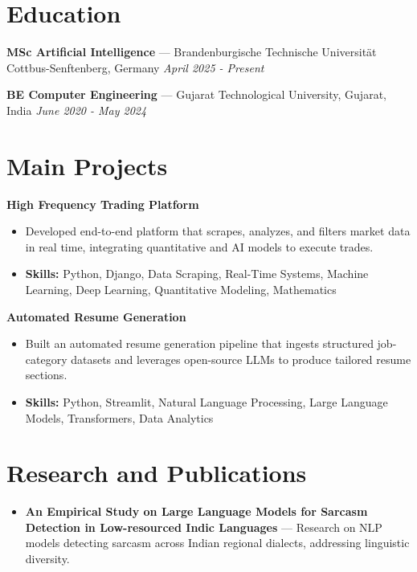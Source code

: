 \documentclass[a4paper,10pt]{article}
\begin{document}
\section*{Education}
\textbf{MSc Artificial Intelligence} — Brandenburgische Technische Universität Cottbus-Senftenberg, Germany \hfill \textit{April 2025 - Present}\par
\vspace{1.5pt}
\textbf{BE Computer Engineering} — Gujarat Technological University, Gujarat, India \hfill \textit{June 2020 - May 2024}\par

\section*{Main Projects}
\textbf{High Frequency Trading Platform}\par
\vspace{1pt}
\begin{itemize}
  \item Developed end-to-end platform that scrapes, analyzes, and filters market data in real time, integrating quantitative and AI models to execute trades.
  \item \textbf{Skills:} Python, Django, Data Scraping, Real-Time Systems, Machine Learning, Deep Learning, Quantitative Modeling, Mathematics
\end{itemize}
\vspace{3pt}
\textbf{Automated Resume Generation}\par
\vspace{1pt}
\begin{itemize}
  \item Built an automated resume generation pipeline that ingests structured job-category datasets and leverages open-source LLMs to produce tailored resume sections.
  \item \textbf{Skills:} Python, Streamlit, Natural Language Processing, Large Language Models, Transformers, Data Analytics
\end{itemize}

\section*{Research and Publications}
\begin{itemize}
\item \textbf{An Empirical Study on Large Language Models for Sarcasm Detection in Low-resourced Indic Languages} — Research on NLP models detecting sarcasm across Indian regional dialects, addressing linguistic diversity.
\end{itemize}
\end{document}
